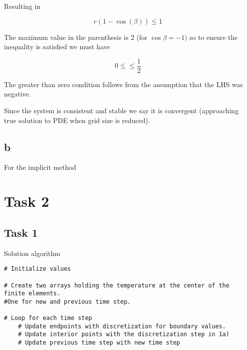 \documentclass{article}
\begin{document}
Resulting in

\begin{equation}
	r(1-\cos(\beta)) \leq 1
\end{equation}

The maximum value in the parenthesis is 2 (for $\cos\beta = -1)$ so to ensure the inequality is satisfied we must have

\begin{equation}
 	0 \leq \leq \frac{1}{2}
\end{equation}

The greater than zero condition follows from the assumption that the LHS was negative.

Since the system is consistent and stable we say it is convergent (approaching true solution to PDE when grid size is reduced).

\subsection*{b}

For the implicit method

\section*{Task 2}

\subsection*{Task 1}

Solution algorithm

\begin{lstlisting}
# Initialize values

# Create two arrays holding the temperature at the center of the finite elements. 
#One for new and previous time step.

# Loop for each time step
	# Update endpoints with discretization for boundary values.
	# Update interior points with the discretization step in 1a)
	# Update previous time step with new time step
\end{lstlisting}
\end{document}

